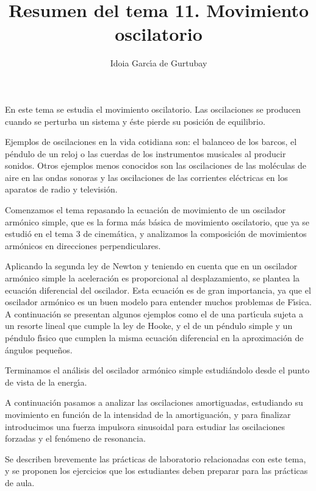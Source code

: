 \documentclass[a4paper,spanish,12pt]{article}
\begin{document}
\title{Resumen del tema 11.  Movimiento oscilatorio}
\author{Idoia Garc\'{\i}a de Gurtubay}
\date{}
\maketitle{}

\thispagestyle{empty}

En este tema se estudia el movimiento oscilatorio. Las oscilaciones se producen cuando se perturba un sistema y 
\'{e}ste pierde su posici\'{o}n de equilibrio.

Ejemplos de oscilaciones  en la vida cotidiana son: el balanceo de los barcos,
 el p\'{e}ndulo de un reloj o las cuerdas de los instrumentos musicales 
al producir sonidos. Otros 
ejemplos menos conocidos son las oscilaciones de las mol\'{e}culas de aire en las ondas sonoras y las oscilaciones 
de las corrientes el\'{e}ctricas en los aparatos de radio y televisi\'{o}n.

Comenzamos el tema repasando la ecuaci\'{o}n de movimiento de un oscilador 
arm\'{o}nico simple, que es la forma m\'{a}s b\'{a}sica de movimiento
 oscilatorio, que ya se estudi\'{o} en el tema 3 de cinem\'{a}tica, y
 analizamos la composici\'{o}n de movimientos arm\'{o}nicos en direcciones perpendiculares.

Aplicando la segunda ley de Newton y teniendo en cuenta que en
 un oscilador arm\'{o}nico simple
 la aceleraci\'{o}n es proporcional al desplazamiento, 
se plantea la ecuaci\'{o}n diferencial del oscilador.
Esta ecuaci\'{o}n es de gran importancia, ya que el oscilador
 arm\'{o}nico es un buen modelo
para entender muchos problemas de F\'{\i}sica. 
A continuaci\'{o}n se presentan algunos ejemplos
como el de una part\'{\i}cula sujeta a un resorte lineal que cumple la
 ley de Hooke, y
 el de un p\'{e}ndulo simple y un p\'{e}ndulo f\'{\i}sico que cumplen la misma ecuaci\'{o}n 
diferencial en la aproximaci\'{o}n de \'{a}ngulos peque\~{n}os.

Terminamos el an\'{a}lisis del oscilador arm\'{o}nico simple estudi\'{a}ndolo desde el 
punto de vista de la energ\'{\i}a.

A continuaci\'{o}n pasamos a analizar las oscilaciones amortiguadas, estudiando su movimiento 
en funci\'{o}n de la intensidad de 
la amortiguaci\'{o}n, y para finalizar introducimos una fuerza impulsora sinusoidal
para estudiar las oscilaciones forzadas y el fen\'{o}meno de resonancia.

Se describen brevemente las pr\'{a}cticas de laboratorio relacionadas
 con este tema, y 
se proponen los ejercicios  que los estudiantes deben preparar para las pr\'{a}cticas de aula.
\end{document}
